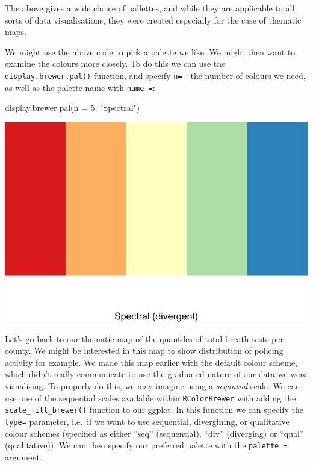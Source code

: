 \documentclass[
]{book}
\newenvironment{Shaded}{\begin{snugshade}}{\end{snugshade}}
\newcommand{\AttributeTok}[1]{\textcolor[rgb]{0.77,0.63,0.00}{#1}}
\newcommand{\DecValTok}[1]{\textcolor[rgb]{0.00,0.00,0.81}{#1}}
\newcommand{\FunctionTok}[1]{\textcolor[rgb]{0.00,0.00,0.00}{#1}}
\newcommand{\NormalTok}[1]{#1}
\newcommand{\StringTok}[1]{\textcolor[rgb]{0.31,0.60,0.02}{#1}}
\begin{document}
The above gives a wide choice of pallettes, and while they are applicable to all sorts of data visualisations, they were created especially for the case of thematic maps.

We might use the above code to pick a palette we like. We might then want to examine the colours more closely. To do this we can use the \texttt{display.brewer.pal()} function, and specify \texttt{n=} - the number of colours we need, as well as the palette name with \texttt{name\ =}:

\begin{Shaded}
\begin{Highlighting}[]
\FunctionTok{display.brewer.pal}\NormalTok{(}\AttributeTok{n =} \DecValTok{5}\NormalTok{, }\StringTok{"Spectral"}\NormalTok{)}
\end{Highlighting}
\end{Shaded}

\includegraphics{crime_mapping_files/figure-latex/unnamed-chunk-157-1.pdf}

Let's go back to our thematic map of the quantiles of total breath tests per county. We might be interested in this map to show distribution of policing activity for example. We made this map earlier with the default colour scheme, which didn't really communicate to use the graduated nature of our data we were visualising. To properly do this, we may imagine using a \emph{seqantial} scale. We can use one of the sequential scales available within \texttt{RColorBrewer} with adding the \texttt{scale\_fill\_brewer()} function to our ggplot. In this function we can specify the \texttt{type=} parameter, i.e.~if we want to use sequential, divergining, or qualitative colour schemes (specified as either ``seq'' (sequential), ``div'' (diverging) or ``qual'' (qualitative)). We can then specify our preferred palette with the \texttt{palette\ =} argument.
\end{document}
